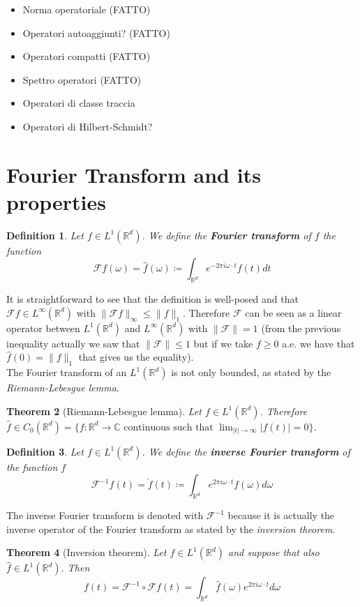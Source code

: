 \documentclass[corpo=11pt, stile=classica, tipotesi=custom,
greek, evenboxes, english]{toptesi}
\numberwithin{equation}{chapter}
\newtheorem{teo}{Theorem}[chapter] %
\newtheorem{defi}[teo]{Definition}
\newcommand{\R}{\mathbb{R}} %
\newcommand{\F}{\mathcal{F}} %
\newcommand{\C}{\mathbb{C}} %
\begin{document}
\begin{itemize}
	\item Norma operatoriale (FATTO)
	\item Operatori autoaggiunti? (FATTO)
	\item Operatori compatti (FATTO)
	\item Spettro operatori (FATTO)
	\item Operatori di classe traccia
	\item Operatori di Hilbert-Schmidt?
\end{itemize}
\section{Fourier Transform and its properties}\label{section Fourier transform and its properties}
\begin{defi}\label{Fourier transform def}
	Let $f \in L^1(\R^d)$. We define the \textbf{Fourier transform} of $f$ the function
	\begin{equation}\label{Fourier transform formula}
		\F f(\omega) = \hat{f}(\omega) \coloneqq \int_{\R^d} e^{-2 \pi i \omega \cdot t} f(t) dt
	\end{equation}
\end{defi}
It is straightforward to see that the definition is well-posed and that $\F f \in L^{\infty}(\R^d)$ with $\|\F f\|_{\infty} \leq \| f \|_1$. Therefore $\F$ can be seen as a linear operator between $L^1(\R^d)$ and $L^{\infty}(\R^d)$ with $\| \F \| = 1$ (from the previous inequality actually we saw that $\| \F \| \leq 1$ but if we take $f \geq 0$ a.e. we have that $\hat{f}(0) = \| f \|_1$ that gives us the equality).\\
The Fourier transform of an $L^1(\R^d)$ is not only bounded, as stated by the \emph{Riemann-Lebesgue lemma}.
\begin{teo}[Riemann-Lebesgue lemma]\label{Riemann-Lebesgue lemma}
	Let $f \in L^1(\R^d)$. Therefore $\hat{f} \in C_0(\R^d) = \{f : \R^d \rightarrow \C \text{ continuous such that } \lim_{|t| \rightarrow \infty} |f(t)|=0\}$.
\end{teo}
\begin{defi}\label{inverse Fourier transform def}
	Let $f \in L^1(\R^d)$. We define the \textbf{inverse Fourier transform} of the function $f$
	\begin{equation}\label{inverse Fourier transform formula}
		\F^{-1} f(t) = \check{f}(t) \coloneqq \int_{\R^d} e^{2 \pi i \omega \cdot t} f(\omega) d\omega
	\end{equation}
\end{defi}
The inverse Fourier transform is denoted with $\F^{-1}$ because it is actually the inverse operator of the Fourier transform as stated by the \emph{inversion theorem}.
\begin{teo}[Inversion theorem]\label{inversion theorem}
	Let $f \in L^1(\R^d)$ and suppose that also $\hat{f} \in L^1(\R^d)$. Then
	\begin{equation*}
		f(t) = \F^{-1} \circ \F f(t) = \int_{\R^d} \hat{f}(\omega) e^{2 \pi i \omega \cdot t}d\omega
	\end{equation*}
\end{teo}
\end{document}
